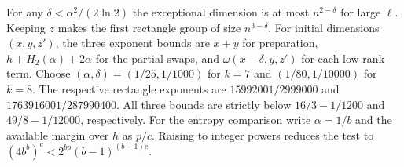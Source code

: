 \documentclass[11pt,letterpaper]{article}
\begin{document}
For any \(\delta<\alpha^2/(2\ln2)\) the exceptional dimension is at most \(n^{2-\delta}\) for large \(\ell\). Keeping \(z\) makes the first rectangle group of size \(n^{3-\delta}\). For initial dimensions \((x,y,z')\), the three exponent bounds are \(x+y\) for preparation, \(h+H_2(\alpha)+2\alpha\) for the partial swaps, and \(\omega(x-\delta,y,z')\) for each low-rank term. Choose \((\alpha,\delta)=(1/25,1/1000)\) for \(k=7\) and \((1/80,1/10000)\) for \(k=8\). The respective rectangle exponents are \(15992001/2999000\) and \(1763916001/287990400\). All three bounds are strictly below \(16/3-1/1200\) and \(49/8-1/12000\), respectively. For the entropy comparison write \(\alpha=1/b\) and the available margin over \(h\) as \(p/c\). Raising to integer powers reduces the test to \((4b^b)^c<2^{bp}(b-1)^{(b-1)c}\).
\clearpage
{}


\end{document}
